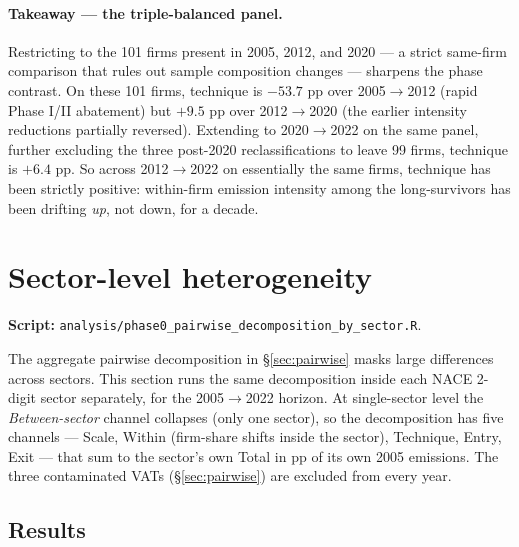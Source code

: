 \documentclass[11pt]{article}
\begin{document}
\paragraph{Takeaway --- the triple-balanced panel.} Restricting to the 101 firms present in 2005, 2012, and 2020 --- a strict same-firm comparison that rules out sample composition changes --- sharpens the phase contrast. On these 101 firms, technique is $\mathbf{-53.7}$ pp over 2005$\to$2012 (rapid Phase I/II abatement) but $\mathbf{+9.5}$ pp over 2012$\to$2020 (the earlier intensity reductions partially reversed). Extending to 2020$\to$2022 on the same panel, further excluding the three post-2020 reclassifications to leave 99 firms, technique is $\mathbf{+6.4}$ pp. So across 2012$\to$2022 on essentially the same firms, technique has been strictly positive: within-firm emission intensity among the long-survivors has been drifting \emph{up}, not down, for a decade.

\section{Sector-level heterogeneity}
\label{sec:sector}

\textbf{Script:} \texttt{analysis/phase0\_pairwise\_decomposition\_by\_sector.R}.

The aggregate pairwise decomposition in \S\ref{sec:pairwise} masks large differences across sectors. This section runs the same decomposition inside each NACE 2-digit sector separately, for the 2005$\to$2022 horizon. At single-sector level the \emph{Between-sector} channel collapses (only one sector), so the decomposition has five channels --- Scale, Within (firm-share shifts inside the sector), Technique, Entry, Exit --- that sum to the sector's own Total in pp of its own 2005 emissions. The three contaminated VATs (\S\ref{sec:pairwise}) are excluded from every year.

\subsection{Results}
\end{document}
